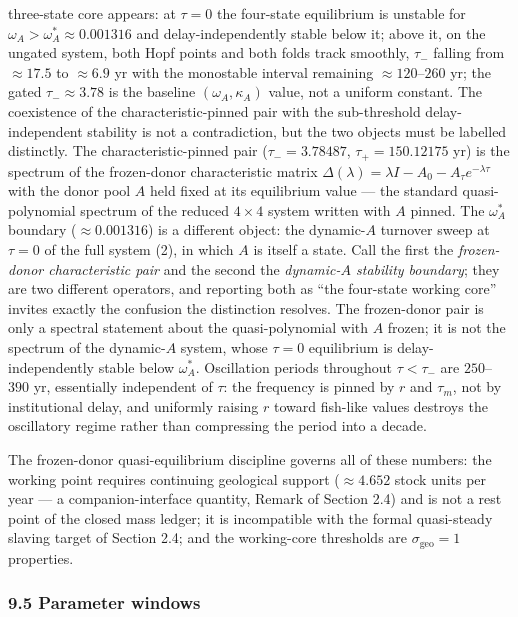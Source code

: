 \documentclass[11pt]{article}
\begin{document}
three-state core appears: at \(\tau = 0\) the four-state equilibrium is
unstable for \(\omega_A > \omega_A^* \approx 0.001316\) and
delay-independently stable below it; above it, on the ungated system,
both Hopf points and both folds track smoothly, \(\tau_-\) falling from
\(\approx17.5\) to \(\approx6.9\) yr with the monostable interval
remaining \(\approx120\)--\(260\) yr; the gated \(\tau_- \approx 3.78\)
is the baseline \((\omega_A, \kappa_A)\) value, not a uniform constant.
The coexistence of the characteristic-pinned pair with the sub-threshold
delay-independent stability is not a contradiction, but the two objects
must be labelled distinctly. The characteristic-pinned pair
(\(\tau_- = 3.78487\), \(\tau_+ = 150.12175\) yr) is the spectrum of the
frozen-donor characteristic matrix
\(\Delta(\lambda) = \lambda I - A_0 - A_\tau e^{-\lambda\tau}\) with the
donor pool \(A\) held fixed at its equilibrium value --- the standard
quasi-polynomial spectrum of the reduced \(4\times4\) system written
with \(A\) pinned. The \(\omega_A^*\) boundary (\(\approx 0.001316\)) is
a different object: the dynamic-\(A\) turnover sweep at \(\tau = 0\) of
the full system (2), in which \(A\) is itself a state. Call the first
the \emph{frozen-donor characteristic pair} and the second the
\emph{dynamic-\(A\) stability boundary}; they are two different
operators, and reporting both as ``the four-state working core'' invites
exactly the confusion the distinction resolves. The frozen-donor pair is
only a spectral statement about the quasi-polynomial with \(A\) frozen;
it is not the spectrum of the dynamic-\(A\) system, whose \(\tau = 0\)
equilibrium is delay-independently stable below \(\omega_A^*\).
Oscillation periods throughout \(\tau < \tau_-\) are \(250\)--\(390\)
yr, essentially independent of \(\tau\): the frequency is pinned by
\(r\) and \(\tau_m\), not by institutional delay, and uniformly raising
\(r\) toward fish-like values destroys the oscillatory regime rather
than compressing the period into a decade.

The frozen-donor quasi-equilibrium discipline governs all of these
numbers: the working point requires continuing geological support
(\(\approx4.652\) stock units per year --- a companion-interface
quantity, Remark of Section 2.4) and is not a rest point of the closed
mass ledger; it is incompatible with the formal quasi-steady slaving
target of Section 2.4; and the working-core thresholds are
\(\sigma_{\mathrm{geo}} = 1\) properties.

\subsubsection{9.5 Parameter windows}\label{parameter-windows}
\end{document}
